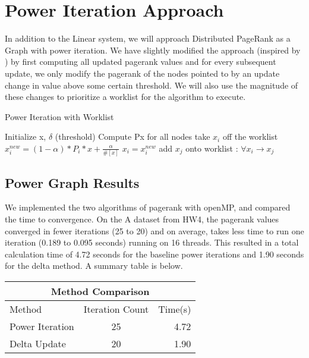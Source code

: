 \documentclass[a4paper,10pt]{article}
\begin{document}
\section{Power Iteration Approach}
In addition to the Linear system, we will approach Distributed PageRank as a Graph with power iteration. We have slightly modified the approach (inspired by \cite{Joyce}) by first computing all updated pagerank values and for every subsequent update, we only modify the pagerank of the nodes pointed to by an update change in value above some certain threshold. We will also use the magnitude of these changes to prioritize a worklist for the algorithm to execute. 
\newline
\begin{algorithm}
\caption{Power Iteration with Worklist}
\begin{algorithmic}[1]
  \STATE Initialize x, $\delta$ (threshold)
  \STATE Compute Px for all nodes
    \STATE take $x_{i}$ off the worklist
	\STATE $x_{i}^{new} = (1-\alpha)*P_{i}*x + \frac{\alpha}{\#[x]}$
		\STATE $x_{i} = x_{i}^{new}$
		\STATE add $x_{j}$ onto worklist : $\forall x_{i} \to x_{j}$
	\ENDIF
  \ENDIF
  \ENDWHILE
\end{algorithmic}
\end{algorithm}
\newline

\subsection{Power Graph Results}
We implemented the two algorithms of pagerank with openMP, and compared the time to convergence. On the A dataset from HW4, the pagerank values converged in fewer iterations (25 to 20) and on average, takes less time to run one iteration (0.189 to 0.095 seconds) running on 16 threads. This resulted in a total calculation time of 4.72 seconds for the baseline power iterations and 1.90 seconds for the delta method. A summary table is below.

\begin{center}
\begin{tabular}{l || c | r}
	\hline
	\multicolumn{3}{c}{Method Comparison} \\
	\hline\hline
	Method & Iteration Count & Time(s) \\
	\hline\hline
	Power Iteration & 25 & 4.72 \\
	Delta Update & 20 & 1.90 \\
\end{tabular}
\end{center}
\end{document}
